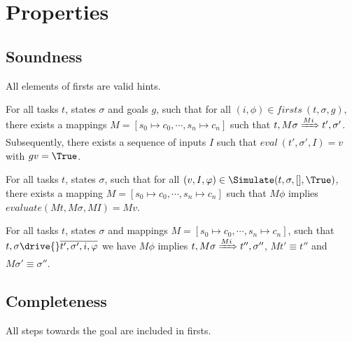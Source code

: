 
\section{Properties}
\label{sec:properties}

\subsection{Soundness}

All elements of firsts are valid hints.

\begin{lemma}
  \label{lem:soundfirsts}

  For all tasks $t$, states $\sigma$ and goals $g$,
  such that for all $(i,\phi)\in firsts\ (t,\sigma,g)$,
  there exists a mappings $M = [s_0\mapsto c_0,\cdots,s_n\mapsto c_n]$
  such that $t,M \sigma \xRightarrow[]{M i} t',\sigma'$.
  Subsequently, there exists a sequence of inputs $I$ such that $eval\ (t',\sigma',I) = v$
  with $g v = \True$.
\end{lemma}

\begin{lemma}
  \label{lem:soundsimulate}

  For all tasks $t$, states $\sigma$,
  such that for all $(v,I,\phi)\in \Simulate (t,\sigma,[],\True)$,
  there exists a mapping $M = [s_0\mapsto c_0,\cdots,s_n\mapsto c_n]$
  such that $M\phi$ implies $evaluate (M t,M \sigma,M I) = M v$.
\end{lemma}

\begin{lemma}
  \label{lem:sounddrive}

  For all tasks $t$, states $\sigma$ and mappings $M=[s_0\mapsto c_0,\cdots,s_n\mapsto c_n]$,
  such that $t,\sigma\drive{} \overline{t',\sigma',i,\phi}$
  we have $M\phi$ implies
  $t,M\sigma \xRightarrow[]{M i} t'',\sigma''$, $Mt' \equiv t''$ and $M\sigma' \equiv \sigma''$.
\end{lemma}

\subsection{Completeness}

All steps towards the goal are included in firsts.

